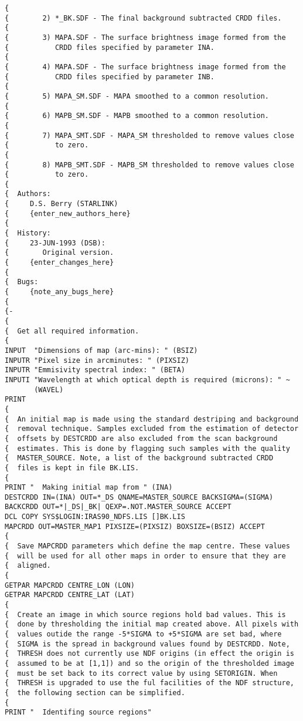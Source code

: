 \begin{verbatim}
{
{        2) *_BK.SDF - The final background subtracted CRDD files.
{
{        3) MAPA.SDF - The surface brightness image formed from the
{           CRDD files specified by parameter INA.
{
{        4) MAPA.SDF - The surface brightness image formed from the
{           CRDD files specified by parameter INB.
{
{        5) MAPA_SM.SDF - MAPA smoothed to a common resolution.
{
{        6) MAPB_SM.SDF - MAPB smoothed to a common resolution.
{
{        7) MAPA_SMT.SDF - MAPA_SM thresholded to remove values close 
{           to zero.
{        
{        8) MAPB_SMT.SDF - MAPB_SM thresholded to remove values close 
{           to zero.
{
{  Authors:
{     D.S. Berry (STARLINK)
{     {enter_new_authors_here}
{
{  History:
{     23-JUN-1993 (DSB):
{        Original version.
{     {enter_changes_here}
{
{  Bugs:
{     {note_any_bugs_here}
{
{-
{
{  Get all required information.
{
INPUT  "Dimensions of map (arc-mins): " (BSIZ)
INPUTR "Pixel size in arcminutes: " (PIXSIZ)
INPUTR "Emmisivity spectral index: " (BETA) 
INPUTI "Wavelength at which optical depth is required (microns): " ~
       (WAVEL)
PRINT 
{
{  An initial map is made using the standard destriping and background
{  removal technique. Samples excluded from the estimation of detector
{  offsets by DESTCRDD are also excluded from the scan background
{  estimates. This is done by flagging such samples with the quality
{  MASTER_SOURCE. Note, a list of the background subtracted CRDD
{  files is kept in file BK.LIS.
{
PRINT "  Making initial map from " (INA)
DESTCRDD IN=(INA) OUT=*_DS QNAME=MASTER_SOURCE BACKSIGMA=(SIGMA)
BACKCRDD OUT=*|_DS|_BK| QEXP=.NOT.MASTER_SOURCE ACCEPT
DCL COPY SYS$LOGIN:IRAS90_NDFS.LIS []BK.LIS
MAPCRDD OUT=MASTER_MAP1 PIXSIZE=(PIXSIZ) BOXSIZE=(BSIZ) ACCEPT
{
{  Save MAPCRDD parameters which define the map centre. These values
{  will be used for all other maps in order to ensure that they are 
{  aligned.
{
GETPAR MAPCRDD CENTRE_LON (LON)
GETPAR MAPCRDD CENTRE_LAT (LAT)
{
{  Create an image in which source regions hold bad values. This is 
{  done by thresholding the initial map created above. All pixels with
{  values outide the range -5*SIGMA to +5*SIGMA are set bad, where 
{  SIGMA is the spread in background values found by DESTCRDD. Note, 
{  THRESH does not currently use NDF origins (in effect the origin is
{  assumed to be at [1,1]) and so the origin of the thresholded image
{  must be set back to its correct value by using SETORIGIN. When 
{  THRESH is upgraded to use the ful facilities of the NDF structure, 
{  the following section can be simplified. 
{
PRINT "  Identifing source regions"

\end{verbatim}

